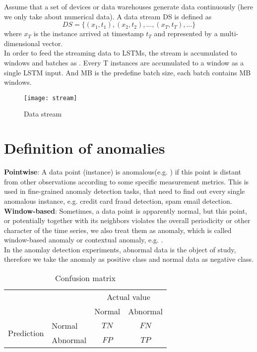 Assume that a set of devices or data warehouses generate data continuously (here we only take about numerical data). A data stream DS is defined as 
\begin{equation} \label{eq:DS}
DS = \{(x_1,t_1),(x_2,t_2), ... , (x_T,t_T), ...\}
\end{equation}
where \textbf{$x_T$} is the instance arrived at timestamp \textbf{$t_T$} and represented by a multi-dimensional vector.\\

In order to feed the streaming data to LSTMs, the stream is accumulated to windows and batches as . Every T instances are accumulated to a window as a single LSTM input. And MB is the predefine batch size, each batch contains MB windows.\\

\begin{figure}[h]
\centering
\texttt{[image: stream]}
\caption[Data stream]{Data stream}
\label{fig:stream}
\end{figure}




\section{Definition of anomalies}
\label{sec:Definition of anomalies}

\textbf{Pointwise}: A data point (instance) is anomalous(e.g. ) if this point is distant from other observations according to some specific measurement metrics. This is used in fine-grained anomaly detection tasks, that need to find out every single anomalous instance, e.g. credit card fraud detection, spam email detection.\\

\textbf{Window-based}: Sometimes, a data point is apparently normal, but this point, or potentially together with its neighbors violates the overall periodicity or other character of the time series, we also treat them as anomaly, which is called window-based anomaly or contextual anomaly, e.g. .\\


In the anomlay detection experiments, abnormal data is the object of study, therefore we take the anomaly as positive class and normal data as negative class. \\

\begin{table}[h]
\begin{center}
\begin{tabular}{l|l|c|c|}
\multicolumn{2}{c}{}&\multicolumn{2}{c}{Actual value}\\
\cline{3-4}
\multicolumn{2}{c|}{}&Normal&Abnormal\\
\cline{2-4}
\multirow{2}{*}{Prediction}& Normal & $TN$ & $FN$\\
\cline{2-4}
& Abnormal & $FP$ & $TP$\\
\cline{2-4}
\end{tabular}
\end{center}
\label{tab:conf}
\caption{Confusion matrix}
\end{table}

